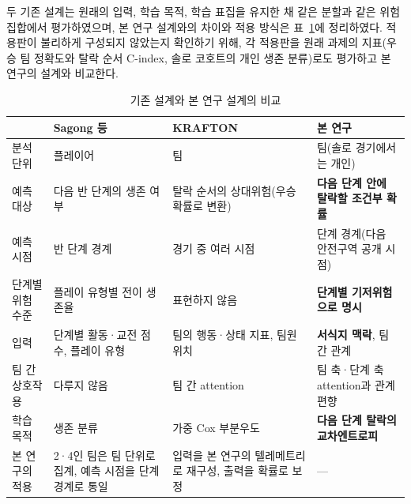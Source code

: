 두 기존 설계는 원래의 입력, 학습 목적, 학습 표집을 유지한 채 같은 분할과 같은 위험집합에서 평가하였으며, 본 연구 설계와의 차이와 적용 방식은 표~\ref{tab:compare}에 정리하였다.
적용판이 불리하게 구성되지 않았는지 확인하기 위해, 각 적용판을 원래 과제의 지표(우승 팀 정확도와 탈락 순서 C-index, 솔로 코호트의 개인 생존 분류)로도 평가하고 본 연구의 설계와 비교한다.

\begin{table}[t]
\centering
\caption{기존 설계와 본 연구 설계의 비교}
\label{tab:compare}
\footnotesize
\renewcommand{\arraystretch}{1.2}
\begin{tabular}{p{2.3cm}p{4.3cm}p{4.6cm}p{4.6cm}}
\hline
 & Sagong 등~\cite{Sagong25a} & KRAFTON~\cite{KRAFTON} & 본 연구 \\
\hline
분석 단위 & 플레이어 & 팀 & 팀(솔로 경기에서는 개인) \\
예측 대상 & 다음 반 단계의 생존 여부 & 탈락 순서의 상대위험(우승확률로 변환) & \textbf{다음 단계 안에 탈락할 조건부 확률} \\
예측 시점 & 반 단계 경계 & 경기 중 여러 시점 & 단계 경계(다음 안전구역 공개 시점) \\
단계별 위험 수준 & 플레이 유형별 전이 생존율 & 표현하지 않음 & \textbf{단계별 기저위험으로 명시} \\
입력 & 단계별 활동·교전 점수, 플레이 유형 & 팀의 행동·상태 지표, 팀원 위치 & \textbf{서식지 맥락}, 팀 간 관계 \\
팀 간 상호작용 & 다루지 않음 & 팀 간 attention & 팀 축·단계 축 attention과 관계 편향 \\
학습 목적 & 생존 분류 & 가중 Cox 부분우도 & \textbf{다음 단계 탈락의 교차엔트로피} \\
\hline
본 연구의 적용 & 2·4인 팀은 팀 단위로 집계, 예측 시점을 단계 경계로 통일 & 입력을 본 연구의 텔레메트리로 재구성, 출력을 확률로 보정~\cite{Platt99} & --- \\
\hline
\end{tabular}
\end{table}

